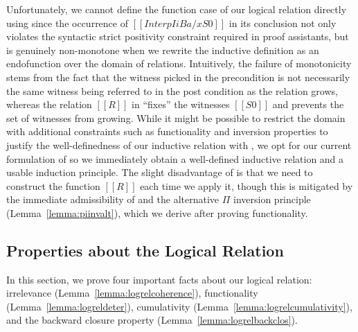 \documentclass[acmsmall,screen=true,
\ifpublic review=false\else,review=true\fi
  ,anonymous=\ifanonymous true\else false\fi]{acmart}
\begin{document}
Unfortunately, we cannot define the function case of our logical
relation directly using  since the occurrence of
$[[Interp I i B {a/x} S0]]$ in its conclusion not only violates the
syntactic strict positivity constraint required in proof assistants,
but is genuinely non-monotone when we rewrite the inductive definition
as an endofunction over the domain of relations.
Intuitively, the failure of monotonicity stems from the fact
that the witness picked in the precondition is not necessarily the
same witness being referred to in the post condition as the relation
grows, whereas the
relation $[[R]]$ in  ``fixes'' the witnesses $[[S0]]$ and
prevents the set of witnesses from growing. While it might
be possible to restrict the domain with additional constraints such as
functionality and inversion properties to justify the well-definedness of our
inductive relation with , we opt for our current
formulation of  so we immediately obtain a
well-defined inductive relation and a usable induction principle. The
slight disadvantage of  is that we need to construct the
function $[[R]]$ each time we apply it, though this is mitigated by
the immediate admissibility of  and the alternative $\Pi$ inversion
principle (Lemma~\ref{lemma:piinvalt}), which we derive after proving functionality.


\subsection{Properties about the Logical Relation}
In this section, we prove four important facts about
our logical relation: irrelevance (Lemma~\ref{lemma:logrelcoherence}),
functionality (Lemma~\ref{lemma:logreldeter}), cumulativity
(Lemma~\ref{lemma:logrelcumulativity}), and the backward closure
property (Lemma~\ref{lemma:logrelbackclos}).
\end{document}
